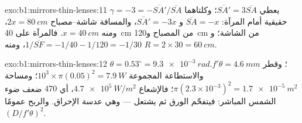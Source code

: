 \begin{solution}{exo:b1:mirrors-thin-lenses:11}
$\gamma = -3 = -\overline{SA'}/\overline{SA}$ يعطي $\overline{SA'} =
3\overline{SA}$؛ وكلتاهما حقيقية أمام المرآة: $\overline{SA} = -x$ و
$\overline{SA'} = -3x$، والمسافة شاشة--مصباح $2x = \qty{80}{cm}$، ومنه
$x = \qty{40}{cm}$. فالمرآة على \qty{40}{cm} من المصباح و\qty{120}{cm}
من الشاشة؛ و$1/\overline{SF} = -1/40 - 1/120 = -1/30$، ومنه
$R = 2 \times 30 = \qty{60}{cm}$.
\end{solution}

\begin{solution}{exo:b1:mirrors-thin-lenses:12}
$\theta = 0.53^\circ = \qty{9.3e-3}{rad}$؛ وقطر  $f'\theta =
\qty{4.6}{mm}$. والاستطاعة المجموعة $10^3 \times \pi(0.05)^2 = \qty{7.9}{W}$؛
ومساحة  $\pi(2.3\times10^{-3})^2 = \qty{1.7e-5}{m^2}$؛ فالإشعاع
$\qty{4.7e5}{W/m^2}$، أي $470$ ضعف ضوء الشمس المباشر: فيتفحّم الورق
ثم يشتعل --- وهي عدسة الإحراق. والربح عمومًا
$(D/f'\theta)^2$.
\end{solution}

